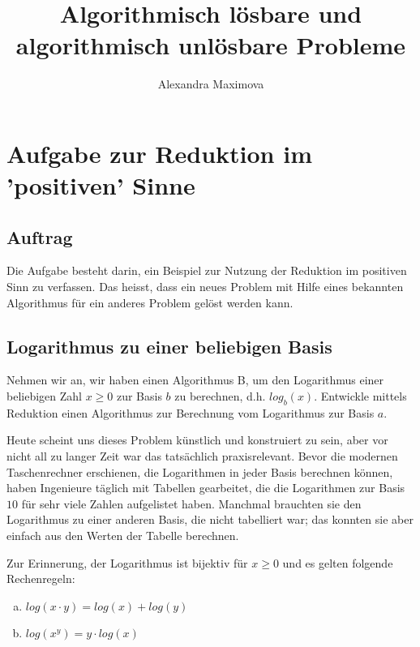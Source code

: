 \documentclass[
	12pt, %
	german, %
]{fphw}
\title{Algorithmisch lösbare und algorithmisch unlösbare Probleme} %
\author{Alexandra Maximova} %
\institute{ETH Zurich \\ Lehrdiplom Informatik} %
\begin{document}
\maketitle %


\section*{Aufgabe zur Reduktion im 'positiven' Sinne}

\subsection*{Auftrag} Die Aufgabe besteht darin, ein Beispiel zur Nutzung der Reduktion im positiven Sinn zu verfassen. Das heisst, dass ein neues Problem mit Hilfe eines bekannten Algorithmus für ein anderes Problem gelöst werden kann.

\begin{problem}
\subsection*{Logarithmus zu einer beliebigen Basis}
	Nehmen wir an, wir haben einen Algorithmus B, um den Logarithmus einer beliebigen Zahl \(x \geq 0\) zur Basis \(b\) zu berechnen, d.h. \(log_b(x)\). Entwickle mittels Reduktion einen Algorithmus zur Berechnung vom Logarithmus zur Basis \(a\).
	
	Heute scheint uns dieses Problem künstlich und konstruiert zu sein, aber vor nicht all zu langer Zeit war das tatsächlich praxisrelevant. Bevor die modernen Taschenrechner erschienen, die Logarithmen in jeder Basis berechnen können, haben Ingenieure täglich mit Tabellen gearbeitet, die die Logarithmen zur Basis \(10\) für sehr viele Zahlen aufgelistet haben. Manchmal brauchten sie den Logarithmus zu einer anderen Basis, die nicht tabelliert war; das konnten sie aber einfach aus den Werten der Tabelle berechnen.
	
	Zur Erinnerung, der Logarithmus ist bijektiv für \(x \geq 0\) und es gelten folgende Rechenregeln:
	\begin{enumerate}[(a)]
		\item \( log(x \cdot y) = log(x) + log(y) \)
		\item \( log(x^y) = y \cdot log(x) \)
	\end{enumerate}
\end{problem}
\end{document}
